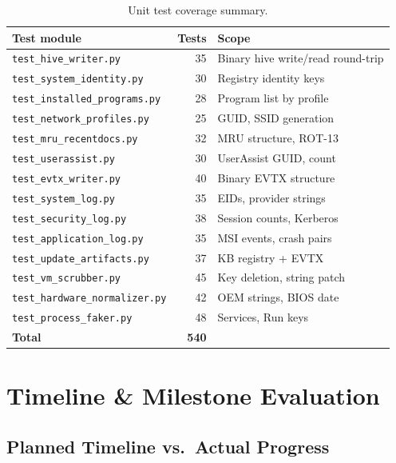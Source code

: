 \documentclass[12pt,a4paper]{article}
\begin{document}
\begin{table}[H]
\centering
\small
\caption{Unit test coverage summary.}
\label{tab:tests}
\begin{tabular}{@{}lrl@{}}
\toprule
\textbf{Test module} & \textbf{Tests} & \textbf{Scope} \\
\midrule
\texttt{test\_hive\_writer.py}          & 35  & Binary hive write/read round-trip \\
\texttt{test\_system\_identity.py}      & 30  & Registry identity keys \\
\texttt{test\_installed\_programs.py}   & 28  & Program list by profile \\
\texttt{test\_network\_profiles.py}     & 25  & GUID, SSID generation \\
\texttt{test\_mru\_recentdocs.py}       & 32  & MRU structure, ROT-13 \\
\texttt{test\_userassist.py}            & 30  & UserAssist GUID, count \\
\texttt{test\_evtx\_writer.py}          & 40  & Binary EVTX structure \\
\texttt{test\_system\_log.py}           & 35  & EIDs, provider strings \\
\texttt{test\_security\_log.py}         & 38  & Session counts, Kerberos \\
\texttt{test\_application\_log.py}      & 35  & MSI events, crash pairs \\
\texttt{test\_update\_artifacts.py}     & 37  & KB registry + EVTX \\
\texttt{test\_vm\_scrubber.py}          & 45  & Key deletion, string patch \\
\texttt{test\_hardware\_normalizer.py}  & 42  & OEM strings, BIOS date \\
\texttt{test\_process\_faker.py}        & 48  & Services, Run keys \\
\midrule
\textbf{Total}                          & \textbf{540} & \\
\bottomrule
\end{tabular}
\end{table}

\section{Timeline \& Milestone Evaluation}
\label{sec:timeline}

\subsection{Planned Timeline vs.\ Actual Progress}
\end{document}
